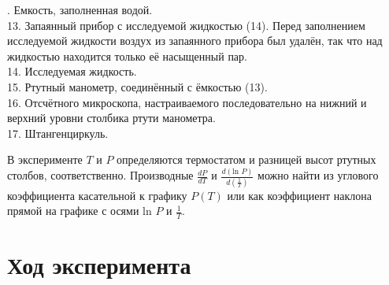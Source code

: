\documentclass[a4paper,12pt]{article} %
\begin{document}
. Емкость, заполненная водой. \\
13. Запаянный прибор с исследуемой жидкостью (14). 
Перед заполнением исследуемой жидкости воздух из запаянного прибора был удалён, 
так что над жидкостью находится только её насыщенный пар. \\
14. Исследуемая жидкость.\\
15. Ртутный манометр, соединённый с ёмкостью (13). \\
16. Отсчётного микроскопа, настраиваемого последовательно на нижний и верхний 
уровни столбика ртути манометра. \\
17. Штангенциркуль.

\medskip 

\bigskip
В эксперименте $T$ и $P$ определяются термостатом и разницей высот ртутных столбов, соответственно. 
Производные $\frac{dP}{dT}$ и $\frac{d(\mbox{ln }P)}{d(\frac1T)}$ можно найти из углового коэффициента 
касательной к графику $P(T)$ или как коэффициент наклона прямой на графике с осями ln $P$ и $\frac1T$.

\section{Ход эксперимента}
\end{document}

